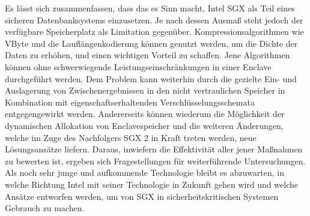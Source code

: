 Es lässt sich zusammenfassen, dass das es Sinn macht, Intel \ac{SGX} als Teil eines sicheren Datenbanksystems einzusetzen. Je nach dessen Ausmaß steht jedoch der verfügbare Speicherplatz als Limitation gegenüber. Kompressionsalgorithmen wie VByte und die Lauflängenkodierung können genutzt werden, um die Dichte der Daten zu erhöhen, und einen wichtigen Vorteil zu schaffen. Jene Algorithmen können ohne schwerwiegende Leistungseinschränkungen in einer Enclave durchgeführt werden. Dem Problem kann weiterhin durch die gezielte Ein- und Auslagerung von Zwischenergebnissen in den nicht vertraulichen Speicher in Kombination mit eigenschaftserhaltenden Verschlüsselungsschemata entgegengewirkt werden. Andererseits können wiederum die Möglichkeit der dynamischen Allokation von Enclavespeicher und die weiteren Änderungen, welche im Zuge des Nachfolgers \ac{SGX} 2 in Kraft treten werden, neue Lösungsansätze liefern. Daraus, inwiefern die Effektivität aller jener Maßnahmen zu bewerten ist, ergeben sich Fragestellungen für weiterführende Untersuchungen. Als noch sehr junge und aufkommende Technologie bleibt es abzuwarten, in welche Richtung Intel mit seiner Technologie in Zukunft gehen wird und welche Ansätze entworfen werden, um von \ac{SGX} in sicherheitskritischen Systemen Gebrauch zu machen.